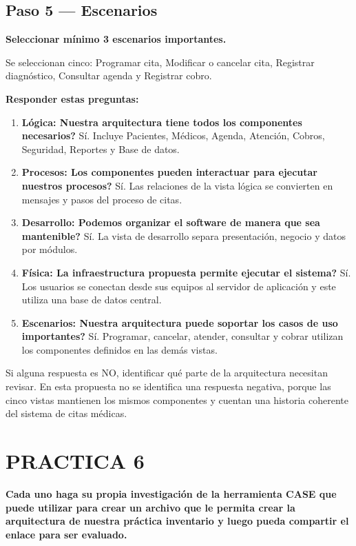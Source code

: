 \subsection*{Paso 5 — Escenarios}
\textbf{Seleccionar mínimo 3 escenarios importantes.}

Se seleccionan cinco: Programar cita, Modificar o cancelar cita, Registrar diagnóstico, Consultar agenda y Registrar cobro.

\textbf{Responder estas preguntas:}

\begin{enumerate}
    \item \textbf{Lógica: \textquestiondown{}Nuestra arquitectura tiene todos los componentes necesarios?} Sí. Incluye Pacientes, Médicos, Agenda, Atención, Cobros, Seguridad, Reportes y Base de datos.
    \item \textbf{Procesos: \textquestiondown{}Los componentes pueden interactuar para ejecutar nuestros procesos?} Sí. Las relaciones de la vista lógica se convierten en mensajes y pasos del proceso de citas.
    \item \textbf{Desarrollo: \textquestiondown{}Podemos organizar el software de manera que sea mantenible?} Sí. La vista de desarrollo separa presentación, negocio y datos por módulos.
    \item \textbf{Física: \textquestiondown{}La infraestructura propuesta permite ejecutar el sistema?} Sí. Los usuarios se conectan desde sus equipos al servidor de aplicación y este utiliza una base de datos central.
    \item \textbf{Escenarios: \textquestiondown{}Nuestra arquitectura puede soportar los casos de uso importantes?} Sí. Programar, cancelar, atender, consultar y cobrar utilizan los componentes definidos en las demás vistas.
\end{enumerate}

Si alguna respuesta es NO, identificar qué parte de la arquitectura necesitan revisar. En esta propuesta no se identifica una respuesta negativa, porque las cinco vistas mantienen los mismos componentes y cuentan una historia coherente del sistema de citas médicas.

\section{PRACTICA 6}

\textbf{Cada uno haga su propia investigación de la herramienta CASE que puede utilizar para crear un archivo que le permita crear la arquitectura de nuestra práctica inventario y luego pueda compartir el enlace para ser evaluado.}

